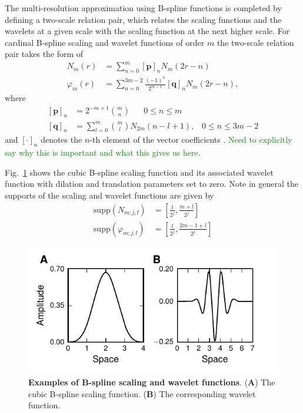 \documentclass[review,authoryear,3p]{elsarticle}
\newcommand{\dean}[1]{\textcolor{green}{#1}}
\begin{document}
The multi-resolution approximation using B-spline functions is completed by defining a two-scale relation pair, which relates the scaling functions and the wavelets at a given scale with the scaling function at the next higher scale. For cardinal B-spline scaling and wavelet functions of order $m$ the two-scale relation pair takes the form of
\begin{align}
 N_{m}\left(r\right)&=\sum_{n=0}^{m} \left[\mathbf p\right]_n N_{m}\left(2r-n\right) \label{eq:MRA-TwoScalepair1} \\
  \varphi_{m}\left(r\right) &= \sum_{n=0}^{3m-2} \frac{\left(-1\right)^n}{2^{m-1}} \left[\mathbf q\right]_n N_{m}\left(2r-n\right)\label{eq:MRA-TwoScalepair2},
 \end{align}
where 
 \begin{align}
\left[\mathbf p\right]_n&=2^{-m+1} \binom{m}{n} \quad \text{ $0\le n\le m$} \label{eq:MRA-TwoScalepair1coefs}\\
\left[\mathbf q\right]_n&= \sum_{l=0}^{m} \binom{m}{l} N_{2m}\left(n-l+1\right), \,  \text{ $0\le n\le 3m-2$}\label{eq:MRA-TwoScalepair2coefs}
 \end{align}
and $\left[\cdot\right]_n$ denotes the $n$-th element of the vector coefficients \citep{Chui1992}. \dean{Need to explicitly say why this is important and what this gives us here.}

Fig.~\ref{fig:MRA-Figure1} shows the cubic B-spline scaling function and its associated wavelet function with dilation and translation parameters set to zero. Note in general the supports of the scaling and wavelet functions are given by 
\begin{align}
	\mathrm{supp}(N_{m;j,l})&=\left[\frac{l}{2^j},\frac{m+l}{2^j}\right] \\  
  \mathrm{supp}(\varphi_{m;j,l})&=\left[\frac{l}{2^j},\frac{2m-1+l}{2^j}\right] 
	\end{align} 
\begin{figure}[!t]
\centering
\includegraphics{./Graph/fig4.pdf}
\caption{{\bf Examples of B-spline scaling and wavelet functions}. (\textbf{A}) The cubic B-spline scaling function. (\textbf{B}) The corresponding wavelet function.}
\label{fig:MRA-Figure1}
\end{figure}
\end{document}
